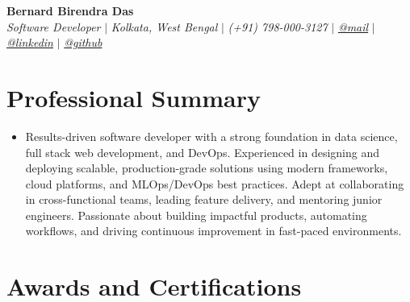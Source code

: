 \documentclass{bernard-resume-ats}
\begin{document}
\begin{flushleft}
    \textbf{\huge Bernard Birendra Das} \\
    \textit{Software Developer} $|$
    \textit{Kolkata, West Bengal} $|$
    \textit{(+91) 798-000-3127} $|$
    \href{mailto:bernardbdas@gmail.com}{{\textit{@mail}}} $|$
    \href{https://linkedin.com/in/bernardbdas}{{\textit{@linkedin}}} $|$
    \href{https://github.com/bernardbdas}{{\textit{@github}}}
    \vspace{-8pt}
\end{flushleft}

\section{Professional Summary}
\vspace{-3pt}
\begin{itemize}[leftmargin=0.15in, label={}]
    \item{Results-driven software developer with a strong foundation in data science, full stack web development, and DevOps. Experienced in designing and deploying scalable, production-grade solutions using modern frameworks, cloud platforms, and MLOps/DevOps best practices. Adept at collaborating in cross-functional teams, leading feature delivery, and mentoring junior engineers. Passionate about building impactful products, automating workflows, and driving continuous improvement in fast-paced environments.}
\end{itemize}
\sectionspace

\section{Awards and Certifications}
    \resumeSubHeadingListStart
    \resumeSubHeadingListEnd



% 
% 
\end{document}
